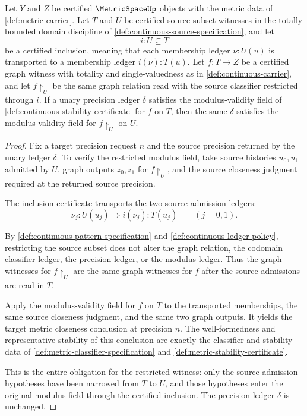 \begin{proposition}
\label{prop:uniform-continuity-modulus-restricts-along-subset-inclusion}
Let $Y$ and $Z$ be certified $\MetricSpaceUp$ objects with the metric data of \autoref{def:metric-carrier}. Let $T$ and $U$ be certified source-subset witnesses in the totally bounded domain discipline of \autoref{def:continuous-source-specification}, and let
$$
i:U\subseteq T
$$
be a certified inclusion, meaning that each membership ledger $\nu:U(u)$ is transported to a membership ledger $i(\nu):T(u)$. Let $f:T\to Z$ be a certified graph witness with totality and single-valuedness as in \autoref{def:continuous-carrier}, and let $f\!\restriction_U$ be the same graph relation read with the source classifier restricted through $i$. If a unary precision ledger $\delta$ satisfies the modulus-validity field of \autoref{def:continuous-stability-certificate} for $f$ on $T$, then the same $\delta$ satisfies the modulus-validity field for $f\!\restriction_U$ on $U$.
\end{proposition}
\begin{proof}
Fix a target precision request $n$ and the source precision returned by the unary ledger $\delta$. To verify the restricted modulus field, take source histories $u_0,u_1$ admitted by $U$, graph outputs $z_0,z_1$ for $f\!\restriction_U$, and the source closeness judgment required at the returned source precision.

The inclusion certificate transports the two source-admission ledgers:
$$
\nu_j:U(u_j)\Longrightarrow i(\nu_j):T(u_j)\qquad(j=0,1).
$$

By \autoref{def:continuous-pattern-specification} and \autoref{def:continuous-ledger-policy}, restricting the source subset does not alter the graph relation, the codomain classifier ledger, the precision ledger, or the modulus ledger. Thus the graph witnesses for $f\!\restriction_U$ are the same graph witnesses for $f$ after the source admissions are read in $T$.

Apply the modulus-validity field for $f$ on $T$ to the transported memberships, the same source closeness judgment, and the same two graph outputs. It yields the target metric closeness conclusion at precision $n$. The well-formedness and representative stability of this conclusion are exactly the classifier and stability data of \autoref{def:metric-classifier-specification} and \autoref{def:metric-stability-certificate}.

This is the entire obligation for the restricted witness: only the source-admission hypotheses have been narrowed from $T$ to $U$, and those hypotheses enter the original modulus field through the certified inclusion. The precision ledger $\delta$ is unchanged.
\end{proof}

